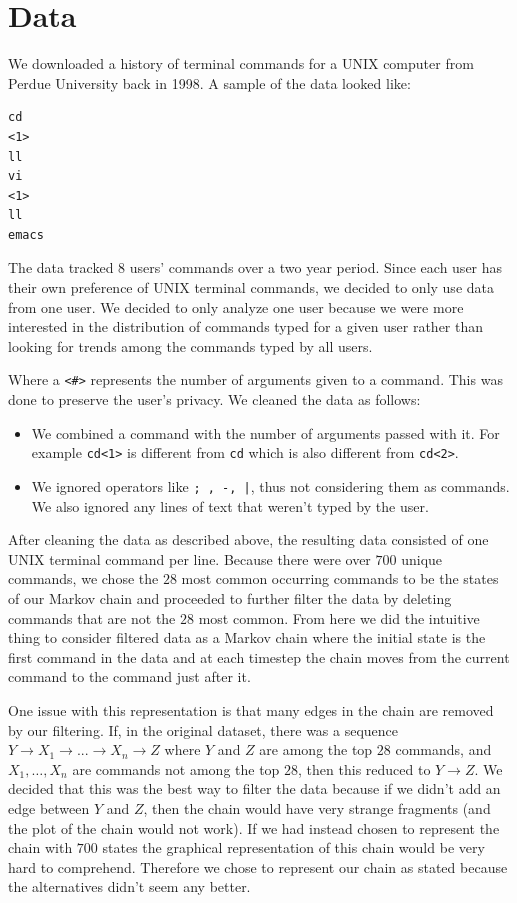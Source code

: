\documentclass[10pt]{article}
\begin{document}
\section{Data}
We downloaded a history of terminal commands for a UNIX computer from Perdue
University back in 1998. A sample of the data looked like:
\begin{verbatim}
cd
<1>
ll
vi
<1>
ll
emacs
\end{verbatim}

The data tracked 8 users' commands over a two year period. Since each user has
their own preference of UNIX terminal commands, we decided to only use data from
one user. We decided to only analyze one user because we were more interested in
the distribution of commands typed for a given user rather than looking for
trends among the commands typed by all users.

Where a \texttt{<\#>} represents the number of arguments given to a command.
This was done to preserve the user's privacy. We cleaned the data as follows:
\begin{itemize}
  \item We combined a command with the number of arguments passed with it. For
    example \texttt{cd<1>} is different from \texttt{cd} which is also different
    from \texttt{cd<2>}.
  \item We ignored operators like \texttt{; , -, |}, thus not considering them
    as commands. We also ignored any lines of text that weren't typed by the
    user.
\end{itemize}

After cleaning the data as described above, the resulting data consisted of one
UNIX terminal command per line. Because there were over $700$ unique commands,
we chose the $28$ most common occurring commands to be the states of our Markov
chain and proceeded to further filter the data by deleting commands that are not
the $28$ most common. From here we did the intuitive thing to consider filtered
data as a Markov chain where the initial state is the first command in the data
and at each timestep the chain moves from the current command to the command
just after it.

One issue with this representation is that many edges in the
chain are removed by our filtering. If, in the original dataset, there was a
sequence $Y \rightarrow X_1 \rightarrow ...  \rightarrow X_n \rightarrow Z$
where $Y$ and $Z$ are among the top $28$ commands, and $X_1,\dots, X_n$ are
commands not among the top $28$, then this reduced to $Y \rightarrow Z$. We
decided that this was the best way to filter the data because if we didn't add
an edge between $Y$ and $Z$, then the chain would have very strange fragments
(and the plot of the chain would not work). If we had instead chosen to
represent the chain with $700$ states the graphical representation of this chain
would be very hard to comprehend. Therefore we chose to represent our chain as
stated because the alternatives didn't seem any better.
\end{document}
